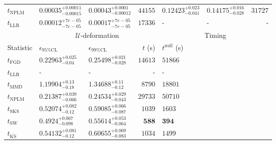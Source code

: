 \begin{tabular}{l|llr|llr}
\rowcolor{red!35}	$t_{\mathrm{NPLM}}$ & $0.00035_{-0.00015}^{+0.00011}$ & $0.00043_{-0.00012}^{+0.0001}$ & $44155$ & $0.12423_{-0.041}^{+0.023}$ & $0.14175_{-0.028}^{+0.016}$ & $31727$ \\
	$t_{\mathrm{LLR}}$ & $0.00012_{-7e-05}^{+7e-05}$ & $0.00017_{-7e-05}^{+7e-05}$ & $17336$ & - & - & - \\
	\toprule
	\multicolumn{1}{c}{} & \multicolumn{3}{c}{$\mathcal{U}$-deformation} & \multicolumn{3}{c}{Timing} \\
	Statistic & $\epsilon_{95\%\mathrm{CL}}$ & $\epsilon_{99\%\mathrm{CL}}$ & $t$ (s) & $t^{\mathrm{null}}$ (s) \\
	\midrule
	$t_{\mathrm{FGD}}$ & ${\mathbf{0.22963_{-0.04}^{+0.025}}}$ & ${\mathbf{0.25498_{-0.028}^{+0.021}}}$ & $14613$ & $51866$ \\
	$t_{\mathrm{LLR}}$ & - & - & - & - \\
	$t_{\mathrm{MMD}}$ & $1.19904_{-0.18}^{+0.13}$ & $1.34688_{-0.12}^{+0.11}$ & $8790$ & $18801$ \\
\rowcolor{red!35}	$t_{\mathrm{NPLM}}$ & $0.21387_{-0.066}^{+0.039}$ & $0.24534_{-0.043}^{+0.029}$ & $29733$ & $50710$ \\
	$t_{\mathrm{SKS}}$ & $0.52074_{-0.12}^{+0.082}$ & $0.59085_{-0.087}^{+0.066}$ & $1039$ & $1603$ \\
	$t_{\mathrm{SW}}$ & $0.4924_{-0.098}^{+0.067}$ & $0.55614_{-0.064}^{+0.053}$ & ${\mathbf{588}}$ & ${\mathbf{394}}$ \\
	$t_{\overline{\mathrm{KS}}}$ & $0.54132_{-0.12}^{+0.081}$ & $0.60655_{-0.083}^{+0.069}$ & $1034$ & $1499$ \\
	\bottomrule
\end{tabular}